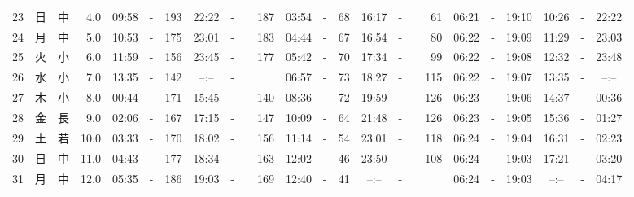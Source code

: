 \documentclass[12pt,a4j]{jsarticle}
\begin{document}
\begin{table}[htbp]
\begin{center}
{\begin{tabular}{|rc|cr|ccrccr|ccrccr|ccc|ccc|}
23 & 日 & 中 &  4.0 &  09:58 &-& 193 &  22:22 &-& 187 &  03:54 &-&  68 &  16:17 &-&  61 & 06:21 & -& 19:10 & 10:26 & -& 22:22 \\
24 & 月 & 中 &  5.0 &  10:53 &-& 175 &  23:01 &-& 183 &  04:44 &-&  67 &  16:54 &-&  80 & 06:22 & -& 19:09 & 11:29 & -& 23:03 \\
25 & 火 & 小 &  6.0 &  11:59 &-& 156 &  23:45 &-& 177 &  05:42 &-&  70 &  17:34 &-&  99 & 06:22 & -& 19:08 & 12:32 & -& 23:48 \\
26 & 水 & 小 &  7.0 &  13:35 &-& 142 &  --:-- &-&~~~~~ &  06:57 &-&  73 &  18:27 &-& 115 & 06:22 & -& 19:07 & 13:35 & -& --:-- \\
27 & 木 & 小 &  8.0 &  00:44 &-& 171 &  15:45 &-& 140 &  08:36 &-&  72 &  19:59 &-& 126 & 06:23 & -& 19:06 & 14:37 & -& 00:36 \\
28 & 金 & 長 &  9.0 &  02:06 &-& 167 &  17:15 &-& 147 &  10:09 &-&  64 &  21:48 &-& 126 & 06:23 & -& 19:05 & 15:36 & -& 01:27 \\
29 & 土 & 若 & 10.0 &  03:33 &-& 170 &  18:02 &-& 156 &  11:14 &-&  54 &  23:01 &-& 118 & 06:24 & -& 19:04 & 16:31 & -& 02:23 \\
30 & 日 & 中 & 11.0 &  04:43 &-& 177 &  18:34 &-& 163 &  12:02 &-&  46 &  23:50 &-& 108 & 06:24 & -& 19:03 & 17:21 & -& 03:20 \\
31 & 月 & 中 & 12.0 &  05:35 &-& 186 &  19:03 &-& 169 &  12:40 &-&  41 &  --:-- &-&~~~~~ & 06:24 & -& 19:03 & --:-- & -& 04:17 \\
   \hline
   \end{tabular}}
   \end{center}
\end{table}
\newpage
\end{document}
